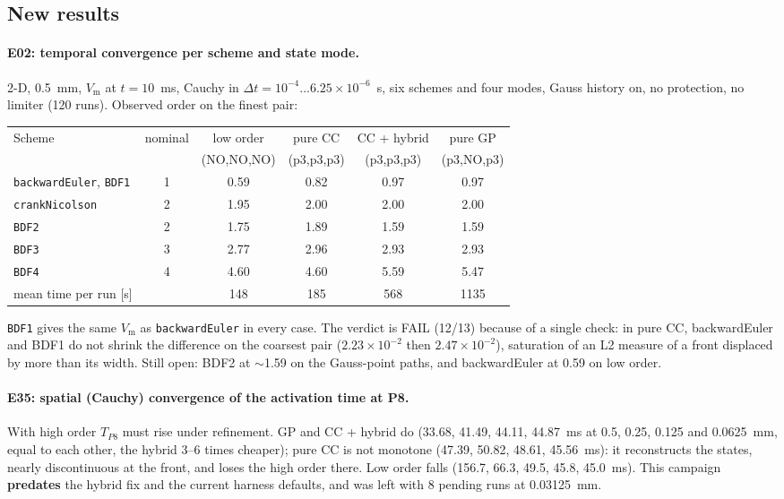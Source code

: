 \documentclass[11pt,a4paper]{article}
\newcommand{\code}[1]{\texttt{\small #1}}
\newcommand{\Vm}{V_{\text{m}}}
\begin{document}
\subsection{New results}
\label{sec:oct-results}

\paragraph{E02: temporal convergence per scheme and state mode.} 2-D, 0.5~mm,
$\Vm$ at $t=10$~ms, Cauchy in $\Delta t=10^{-4}\dots6.25\times10^{-6}$~s, six
schemes and four modes, Gauss history on, no protection, no limiter (120 runs).
Observed order on the finest pair:

\begin{center}
\begin{tabular}{@{}lccccc@{}}
\toprule
Scheme & nominal & low order & pure CC & CC + hybrid & pure GP \\
       &         & (NO,NO,NO) & (p3,p3,p3) & (p3,p3,p3) & (p3,NO,p3) \\
\midrule
\code{backwardEuler}, \code{BDF1} & 1 & 0.59 & 0.82 & 0.97 & 0.97 \\
\code{crankNicolson} & 2 & 1.95 & 2.00 & 2.00 & 2.00 \\
\code{BDF2} & 2 & 1.75 & 1.89 & 1.59 & 1.59 \\
\code{BDF3} & 3 & 2.77 & 2.96 & 2.93 & 2.93 \\
\code{BDF4} & 4 & 4.60 & 4.60 & 5.59 & 5.47 \\
\midrule
mean time per run [s] & & 148 & 185 & 568 & 1135 \\
\bottomrule
\end{tabular}
\end{center}

\code{BDF1} gives the same $\Vm$ as \code{backwardEuler} in every case. The verdict
is FAIL (12/13) because of a single check: in pure CC, backwardEuler and BDF1 do not
shrink the difference on the coarsest pair ($2.23\times10^{-2}$ then
$2.47\times10^{-2}$), saturation of an L2 measure of a front displaced by more than
its width. Still open: BDF2 at $\sim$1.59 on the Gauss-point paths, and
backwardEuler at 0.59 on low order.

\paragraph{E35: spatial (Cauchy) convergence of the activation time at P8.} With
high order $T_{P8}$ must rise under refinement. GP and CC + hybrid do (33.68,
41.49, 44.11, 44.87~ms at 0.5, 0.25, 0.125 and 0.0625~mm, equal to each other, the
hybrid 3--6 times cheaper); pure CC is not monotone (47.39, 50.82, 48.61,
45.56~ms): it reconstructs the states, nearly discontinuous at the front, and loses
the high order there. Low order falls (156.7, 66.3, 49.5, 45.8, 45.0~ms). This
campaign \textbf{predates} the hybrid fix and the current harness defaults, and
was left with 8 pending runs at 0.03125~mm.
\end{document}
